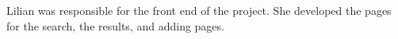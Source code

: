 Lilian was responsible for the front end of the project. She developed the pages for the search, the results, and adding pages. 
